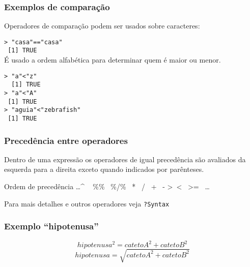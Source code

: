 \documentclass{beamer}
\begin{document}
\begin{frame}
  \frametitle{Exemplos de comparação}
  Operadores de comparação podem ser usados sobre caracteres:

\texttt{> "casa"=="casa" \\
~[1] TRUE\\ \pause
}
\vspace{10pt}
 É usado a ordem alfabética para determinar quem é maior ou menor.

 \texttt{> "a"\textless"z"\\
~ [1] TRUE \\ \pause
 > "a"\textless"A" \\
~[1] TRUE \\ \pause
 > "aguia"\textless"zebrafish"\\
~[1] TRUE 
} 
\end{frame}



\begin{frame}
    \frametitle{Precedência entre operadores}
 Dentro de uma expressão os operadores de igual precedência são avaliados da esquerda para a direita exceto quando indicados por parênteses. 
 
 \begin{block}{Ordem de precedência}
    \ldots \^{} ~ \%\%{}~ \%/\%{}~  *{}~ /{}~ +{}~ - \textgreater {}~\textless{}~ \textgreater=~ \ldots 
 \end{block}
  Para mais detalhes e outros operadores veja \texttt{?Syntax}
\end{frame}


\begin{frame}
  \frametitle{Exemplo ``hipotenusa''}
      \centering

      \[hipotenusa^{2} = catetoA^{2} + catetoB^{2} \]
      \[hipotenusa=\sqrt{catetoA^{2} + catetoB^{2}} \]
 \end{frame}
\end{document}
